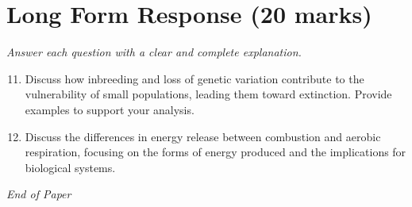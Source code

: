 \documentclass[12pt]{article}
\begin{document}
\section*{Long Form Response (20 marks)}
\textit{Answer each question with a clear and complete explanation.}
\begin{enumerate}[label=\arabic*.]
\setcounter{enumi}{10}
\item Discuss how inbreeding and loss of genetic variation contribute to the vulnerability of small populations, leading them toward extinction. Provide examples to support your analysis.
\item Discuss the differences in energy release between combustion and aerobic respiration, focusing on the forms of energy produced and the implications for biological systems.
\end{enumerate}

\vfill
\noindent\textit{End of Paper}
\end{document}
